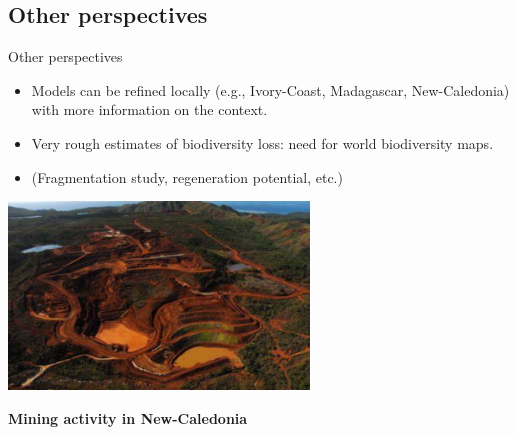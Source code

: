 \documentclass[10pt,table,dvipsnames,compress]{beamer}
\begin{document}
\subsection{Other perspectives}
\label{sec:org4e664b5}
\begin{frame}[label={sec:orge4cec1e}]{Other perspectives}
\begin{itemize}
\item Models can be refined locally (e.g., Ivory-Coast, Madagascar,
New-Caledonia) with more information on the context.
\item Very rough estimates of biodiversity loss: need for world biodiversity
maps.
\item (Fragmentation study, regeneration potential, etc.)
\end{itemize}

\vspace{0.25cm}
\centering \includegraphics[width=0.6\textwidth]{figs/mines-NC}

\textbf{Mining activity in New-Caledonia}
\end{frame}

\end{document}
